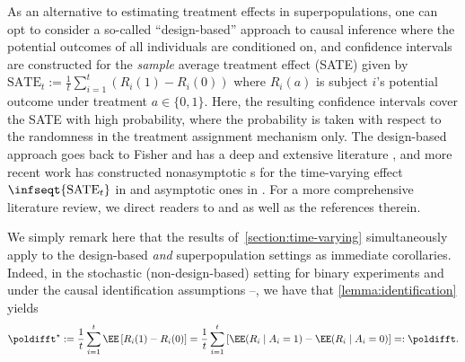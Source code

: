 \begin{remark}
  As an alternative to estimating treatment effects in superpopulations, one can opt to consider a so-called ``design-based'' approach to causal inference where the potential outcomes of all individuals are conditioned on, and confidence intervals are constructed for the \emph{sample} average treatment effect (SATE) given by $\mathrm{SATE}_t := \frac{1}{t}\sum_{i=1}^t (R_i(1) - R_i(0))$ where $R_i(a)$ is subject $i$'s potential outcome under treatment $a \in \{0, 1\}$. Here, the resulting confidence intervals cover the SATE with high probability, where the probability is taken with respect to the randomness in the treatment assignment mechanism only. The design-based approach goes back to Fisher and has a deep and extensive literature \citep{fisher1936design,splawa1990application,imbens2015causal}, and more recent work has constructed nonasymptotic \cs{}s for the time-varying effect $\infseqt{\mathrm{SATE}_t}$ in \citet[Section 4.2]{howard2018uniform} and asymptotic ones in \citet{ham2022design}. For a more comprehensive literature review, we direct readers to \citet{abadie2020sampling} and \citet{ham2022design} as well as the references therein.

  We simply remark here that the results of~\cref{section:time-varying} simultaneously apply to the design-based \emph{and} superpopulation settings as immediate corollaries. Indeed, in the stochastic (non-design-based) setting for binary experiments and under the causal identification assumptions --, we have that \cref{lemma:identification} yields
  \begin{equation}
    \poldifft^\star := \frac{1}{t}\sum_{i=1}^t \EE \left [ R_i(1) - R_i(0) \right ]  = \frac{1}{t}\sum_{i=1}^t \left [ \EE(R_i \mid A_i = 1) - \EE(R_i \mid A_i = 0)  \right ] =: \poldifft.
  \end{equation}


\end{remark}

